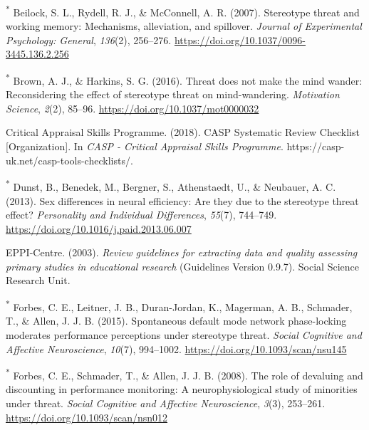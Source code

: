 \documentclass[
  stu, a4paper,floatsintext]{apa7}
\newlength{\cslhangindent}
\newenvironment{CSLReferences}[2] %
 {\begin{list}{}{%
  \setlength{\itemindent}{0pt}
  \setlength{\leftmargin}{0pt}
  \setlength{\parsep}{0pt}
  \ifodd #1
   \setlength{\leftmargin}{\cslhangindent}
   \setlength{\itemindent}{-1\cslhangindent}
  \fi
  \setlength{\itemsep}{#2\baselineskip}}}
 {\end{list}}
\begin{document}
\begin{CSLReferences}{1}{0}
\textsuperscript{*} Beilock, S. L., Rydell, R. J., \& McConnell, A. R. (2007). Stereotype threat and working memory: {Mechanisms}, alleviation, and spillover. \emph{Journal of Experimental Psychology: General}, \emph{136}(2), 256--276. \url{https://doi.org/10.1037/0096-3445.136.2.256}

\textsuperscript{*} Brown, A. J., \& Harkins, S. G. (2016). Threat does not make the mind wander: {Reconsidering} the effect of stereotype threat on mind-wandering. \emph{Motivation Science}, \emph{2}(2), 85--96. \url{https://doi.org/10.1037/mot0000032}

Critical Appraisal Skills Programme. (2018). {CASP Systematic Review Checklist} {[}Organization{]}. In \emph{CASP - Critical Appraisal Skills Programme}. https://casp-uk.net/casp-tools-checklists/.

\textsuperscript{*} Dunst, B., Benedek, M., Bergner, S., Athenstaedt, U., \& Neubauer, A. C. (2013). Sex differences in neural efficiency: {Are} they due to the stereotype threat effect? \emph{Personality and Individual Differences}, \emph{55}(7), 744--749. \url{https://doi.org/10.1016/j.paid.2013.06.007}

EPPI-Centre. (2003). \emph{Review guidelines for extracting data and quality assessing primary studies in educational research} (Guidelines Version 0.9.7). Social Science Research Unit.

\textsuperscript{*} Forbes, C. E., Leitner, J. B., Duran-Jordan, K., Magerman, A. B., Schmader, T., \& Allen, J. J. B. (2015). Spontaneous default mode network phase-locking moderates performance perceptions under stereotype threat. \emph{Social Cognitive and Affective Neuroscience}, \emph{10}(7), 994--1002. \url{https://doi.org/10.1093/scan/nsu145}

\textsuperscript{*} Forbes, C. E., Schmader, T., \& Allen, J. J. B. (2008). The role of devaluing and discounting in performance monitoring: A neurophysiological study of minorities under threat. \emph{Social Cognitive and Affective Neuroscience}, \emph{3}(3), 253--261. \url{https://doi.org/10.1093/scan/nsn012}


\end{CSLReferences}
\end{document}

